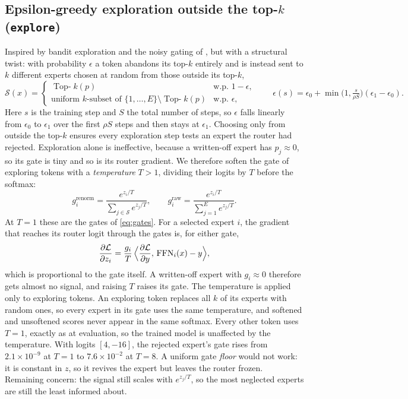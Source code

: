 \documentclass[10pt]{article}
\theoremstyle{definition}
\theoremstyle{remark}
\newcommand{\FFN}{\mathrm{FFN}}
\newcommand{\topk}{\operatorname{Top-}k}
\newcommand{\code}[1]{\texttt{#1}}
\begin{document}
\subsection{Epsilon-greedy exploration outside the top-$k$ (\code{explore})}
Inspired by bandit exploration \citep{sutton2018reinforcement} and the noisy gating of \citet{shazeer2017outrageously}, but with a structural twist: with probability $\epsilon$ a token abandons its top-$k$ entirely and is instead sent to $k$ different experts chosen at random from those outside its top-$k$,
\begin{equation}
\mathcal{S}(x) = \begin{cases} \topk(p) & \text{w.p. } 1-\epsilon,\\ \text{uniform $k$-subset of } \{1,\dots,E\}\setminus\topk(p) & \text{w.p. } \epsilon, \end{cases}
\qquad
\epsilon(s)=\epsilon_0+\min\!\bigl(1,\tfrac{s}{\rho S}\bigr)(\epsilon_1-\epsilon_0).
\end{equation}
Here $s$ is the training step and $S$ the total number of steps, so $\epsilon$ falls linearly from $\epsilon_0$ to $\epsilon_1$ over the first $\rho S$ steps and then stays at $\epsilon_1$. Choosing only from outside the top-$k$ ensures every exploration step tests an expert the router had rejected. Exploration alone is ineffective, because a written-off expert has $p_j\approx 0$, so its gate is tiny and so is its router gradient. We therefore soften the gate of exploring tokens with a \emph{temperature} $T>1$, dividing their logits by $T$ before the softmax:
\begin{equation}
g_i^{\text{renorm}} = \frac{e^{z_i/T}}{\sum_{j\in\mathcal{S}} e^{z_j/T}}, \qquad g_i^{\text{raw}} = \frac{e^{z_i/T}}{\sum_{j=1}^{E} e^{z_j/T}}.
\label{eq:tempered-gates}
\end{equation}
At $T=1$ these are the gates of \eqref{eq:gates}. For a selected expert $i$, the gradient that reaches its router logit through the gates is, for either gate,
\begin{equation}
\frac{\partial\mathcal{L}}{\partial z_i} = \frac{g_i}{T}\,\Bigl\langle \frac{\partial\mathcal{L}}{\partial y},\,\FFN_i(x)-y\Bigr\rangle ,
\label{eq:gate-grad}
\end{equation}
which is proportional to the gate itself. A written-off expert with $g_i\approx 0$ therefore gets almost no signal, and raising $T$ raises its gate. The temperature is applied only to exploring tokens. An exploring token replaces all $k$ of its experts with random ones, so every expert in its gate uses the same temperature, and softened and unsoftened scores never appear in the same softmax. Every other token uses $T=1$, exactly as at evaluation, so the trained model is unaffected by the temperature. With logits $[4,-16]$, the rejected expert's gate rises from $2.1\times10^{-9}$ at $T=1$ to $7.6\times10^{-2}$ at $T=8$. A uniform gate \emph{floor} would not work: it is constant in $z$, so it revives the expert but leaves the router frozen. Remaining concern: the signal still scales with $e^{z_j/T}$, so the most neglected experts are still the least informed about.
\end{document}
